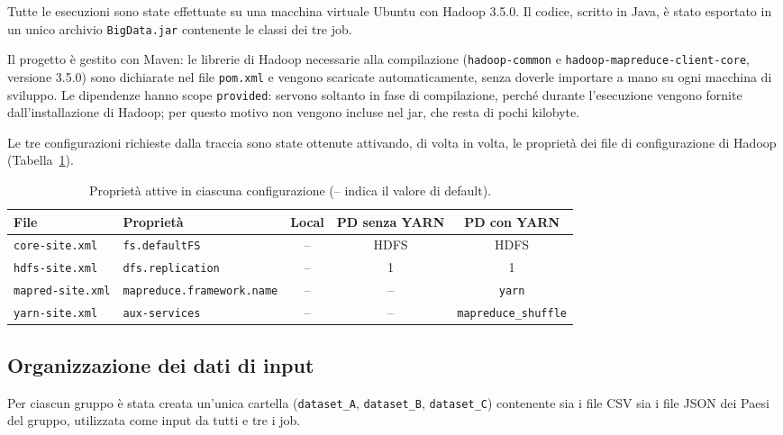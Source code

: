 \documentclass[12pt, a4paper]{article}
\begin{document}
Tutte le esecuzioni sono state effettuate su una
macchina virtuale Ubuntu con Hadoop 3.5.0.
Il codice, scritto in Java,
è stato esportato in un unico archivio \texttt{BigData.jar}
contenente le classi dei tre job.

Il progetto è gestito con Maven: le librerie di Hadoop
necessarie alla compilazione (\texttt{hadoop-common} e
\texttt{hadoop-mapreduce-client-core}, versione 3.5.0)
sono dichiarate nel file \texttt{pom.xml} e vengono
scaricate automaticamente, senza doverle importare a mano
su ogni macchina di sviluppo. Le dipendenze hanno scope
\texttt{provided}: servono soltanto in fase di compilazione,
perché durante l'esecuzione vengono fornite
dall'installazione di Hadoop; per questo motivo
non vengono incluse nel jar, che resta di pochi kilobyte.

Le tre configurazioni richieste dalla traccia
sono state ottenute attivando, di volta in volta,
le proprietà dei file di configurazione di Hadoop
(Tabella~\ref{tab:configurazioni}).

\begin{table}[H]
\centering
\footnotesize
\setlength{\tabcolsep}{4pt}
\begin{tabular}{|l|l|c|c|c|}
\hline
\textbf{File} & \textbf{Proprietà} & \textbf{Local} & \textbf{PD senza YARN} & \textbf{PD con YARN} \\
\hline
\texttt{core-site.xml} & \texttt{fs.defaultFS} & -- & HDFS & HDFS \\
\texttt{hdfs-site.xml} & \texttt{dfs.replication} & -- & 1 & 1 \\
\texttt{mapred-site.xml} & \texttt{mapreduce.framework.name} & -- & -- & \texttt{yarn} \\
\texttt{yarn-site.xml} & \texttt{aux-services} & -- & -- & \texttt{mapreduce\_shuffle} \\
\hline
\end{tabular}
\caption{Proprietà attive in ciascuna configurazione
(-- indica il valore di default).}
\label{tab:configurazioni}
\end{table}

\subsection{Organizzazione dei dati di input}

Per ciascun gruppo è stata creata un'unica cartella
(\texttt{dataset\_A}, \texttt{dataset\_B}, \texttt{dataset\_C})
contenente sia i file CSV sia i file JSON dei Paesi del gruppo,
utilizzata come input da tutti e tre i job.
\end{document}
